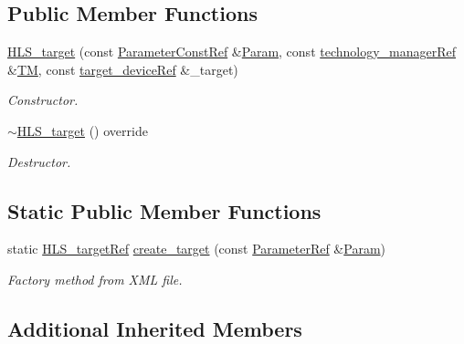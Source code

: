 \subsection*{Public Member Functions}
\begin{DoxyCompactItemize}
\item 
\hyperlink{classHLS__target_ac3a4f4a023bf8fceb35226d71bf2ad44}{H\+L\+S\+\_\+target} (const \hyperlink{Parameter_8hpp_a37841774a6fcb479b597fdf8955eb4ea}{Parameter\+Const\+Ref} \&\hyperlink{classtarget__manager_adbf98931b360d2f93983a484b5af88db}{Param}, const \hyperlink{technology__manager_8hpp_a4b9ecd440c804109c962654f9227244e}{technology\+\_\+manager\+Ref} \&\hyperlink{classtarget__manager_a9169f1cec19f8474a03781ca1c80fff0}{TM}, const \hyperlink{target__device_8hpp_acedb2b7a617e27e6354a8049fee44eda}{target\+\_\+device\+Ref} \&\+\_\+target)
\begin{DoxyCompactList}\small\item\em Constructor. \end{DoxyCompactList}\item 
\hyperlink{classHLS__target_a18e32dd957d5413eb4c05dc105ea5b91}{$\sim$\+H\+L\+S\+\_\+target} () override
\begin{DoxyCompactList}\small\item\em Destructor. \end{DoxyCompactList}\end{DoxyCompactItemize}
\subsection*{Static Public Member Functions}
\begin{DoxyCompactItemize}
\item 
static \hyperlink{hls__target_8hpp_a390f1d55d3b31739665ff2776abe2a3f}{H\+L\+S\+\_\+target\+Ref} \hyperlink{classHLS__target_a08b0c129bed7fe1817fb47e52aeb5b86}{create\+\_\+target} (const \hyperlink{Parameter_8hpp_a379beb25e5350c4c5585247ed50be3f9}{Parameter\+Ref} \&\hyperlink{classtarget__manager_adbf98931b360d2f93983a484b5af88db}{Param})
\begin{DoxyCompactList}\small\item\em Factory method from X\+ML file. \end{DoxyCompactList}\end{DoxyCompactItemize}
\subsection*{Additional Inherited Members}


